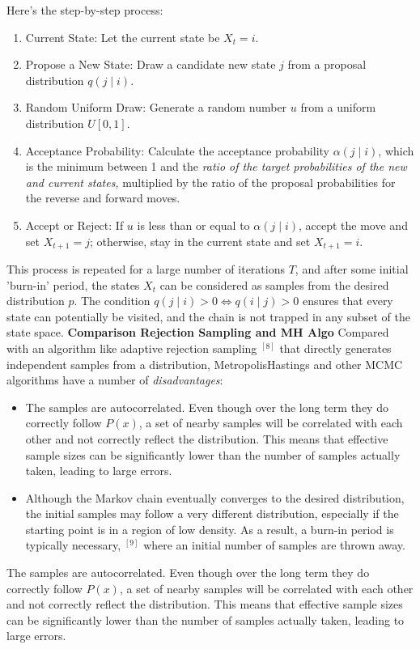 \documentclass{article}
\begin{document}
Here's the step-by-step process:
\begin{enumerate}
    \item Current State: Let the current state be \( X_t = i \).
    \item Propose a New State: Draw a candidate new state \( j \) from a proposal distribution \( q(j \mid i) \).
    \item Random Uniform Draw: Generate a random number \( u \) from a uniform distribution \( U[0,1] \).
\item Acceptance Probability: Calculate the acceptance probability \( \alpha(j \mid i) \), which is the minimum between 1 and the\textit{ ratio of the target probabilities of the new and current states,} multiplied by the ratio of the proposal probabilities for the reverse and forward moves.
\item Accept or Reject: If \( u \) is less than or equal to \( \alpha(j \mid i) \), accept the move and set \( X_{t+1} = j \); otherwise, stay in the current state and set \( X_{t+1} = i \).
\end{enumerate}

This process is repeated for a large number of iterations \( T \), and after some initial 'burn-in' period, the states \( X_t \) can be considered as samples from the desired distribution \( p \). The condition \( q(j \mid i) > 0 \Leftrightarrow q(i \mid j) > 0 \) ensures that every state can potentially be visited, and the chain is not trapped in any subset of the state space.
\newline
\textbf{Comparison Rejection Sampling and MH Algo}
\newline
Compared with an algorithm like adaptive rejection sampling ${ }^{[8]}$ that directly generates independent samples from a distribution, MetropolisHastings and other MCMC algorithms have a number of \textit{disadvantages}:
\begin{itemize}
    \item The samples are autocorrelated. Even though over the long term they do correctly follow $P(x)$, a set of nearby samples will be correlated with each other and not correctly reflect the distribution. This means that effective sample sizes can be significantly lower than the number of samples actually taken, leading to large errors.
    \item Although the Markov chain eventually converges to the desired distribution, the initial samples may follow a very different distribution, especially if the starting point is in a region of low density. As a result, a burn-in period is typically necessary, ${ }^{[9]}$ where an initial number of samples are thrown away.

\end{itemize}
The samples are autocorrelated. Even though over the long term they do correctly follow $P(x)$, a set of nearby samples will be correlated with each other and not correctly reflect the distribution. This means that effective sample sizes can be significantly lower than the number of samples actually taken, leading to large errors.
\end{document}
